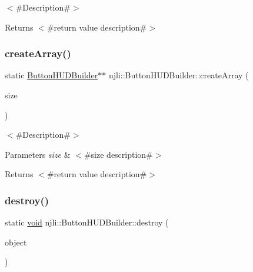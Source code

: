$<$\#\+Description\#$>$

\begin{DoxyReturn}{Returns}
$<$\#return value description\#$>$ 
\end{DoxyReturn}
\mbox{\label{classnjli_1_1_button_h_u_d_builder_a885b3db72e0db164d1a1748f18fa15df}} 
\subsubsection{\texorpdfstring{create\+Array()}{createArray()}}
{\footnotesize\ttfamily static \mbox{\hyperlink{classnjli_1_1_button_h_u_d_builder}{Button\+H\+U\+D\+Builder}}$\ast$$\ast$ njli\+::\+Button\+H\+U\+D\+Builder\+::create\+Array (\begin{DoxyParamCaption}\item[{const \mbox{\hyperlink{_util_8h_a10e94b422ef0c20dcdec20d31a1f5049}{u32}}}]{size }\end{DoxyParamCaption})\hspace{0.3cm}{\ttfamily [static]}}

$<$\#\+Description\#$>$


\begin{DoxyParams}{Parameters}
{\em size} & $<$\#size description\#$>$\\
\hline
\end{DoxyParams}
\begin{DoxyReturn}{Returns}
$<$\#return value description\#$>$ 
\end{DoxyReturn}
\mbox{\label{classnjli_1_1_button_h_u_d_builder_a0559e0c777d3cae524083ec7bc90d197}} 
\subsubsection{\texorpdfstring{destroy()}{destroy()}}
{\footnotesize\ttfamily static \mbox{\hyperlink{_thread_8h_af1e856da2e658414cb2456cb6f7ebc66}{void}} njli\+::\+Button\+H\+U\+D\+Builder\+::destroy (\begin{DoxyParamCaption}\item[{\mbox{\hyperlink{classnjli_1_1_button_h_u_d_builder}{Button\+H\+U\+D\+Builder}} $\ast$}]{object }\end{DoxyParamCaption})\hspace{0.3cm}{\ttfamily [static]}}

